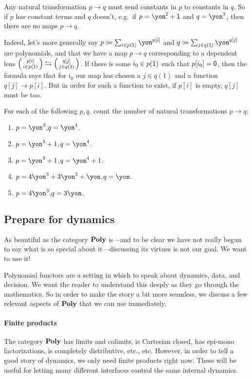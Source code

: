 \documentclass[DynamicalBook]{subfiles}
\begin{document}
\begin{example}\label{ex.const_to_const}
Any natural transformation $p\to q$ must send constants in $p$ to constants in $q$. So if $p$ has constant terms and $q$ doesn't, e.g.\ if $p=\yon^\2+\1$ and $q=\yon^3$, then there are no maps $p\to q$. 

Indeed, let's more generally say $p\coloneqq\sum_{i\in p(\1)}\yon^{p[i]}$ and
$q\coloneqq\sum_{j\in q(\1)}\yon^{q[j]}$ are polynomials, and that we have a map
$p\to q$ corresponding to a dependent lens $\lens{p[i]}{i \in p(\1)} \fromto
\lens{q[j]}{j \in q(\1)}$. If there is some $i_0\in p(\textsf{1})$ such that $p[i_0]=\textsf{0}$, then the formula says that for $i_0$ our map has chosen a $j\in q(1)$ and a function $q[j]\to p[i]$. But in order for such a function to exist, if $p[i]$ is empty, $q[j]$ must be too.
\end{example}

\begin{exercise}
For each of the following $p,q$, count the number of natural transformations $p\to q$:
\begin{enumerate}
	\item $p=\yon^3$,\quad $q=\yon^4$.
	\item $p=\yon^3+1$,\quad $q=\yon^4$.
	\item $p=\yon^3+1$,\quad $q=\yon^4+1$.
	\item $p=4\yon^3+3\yon^2+\yon$,\quad $q=\yon$.
	\item $p=4\yon^3$,\quad $q=3\yon$.
\qedhere
\end{enumerate}
\end{exercise}

\subsection{Prepare for dynamics}\label{subsec_prepare_dyn}

As beautiful as the category $\textbf{Poly}$ is---and to be clear we have not really begun to say what is so special about it---discussing its virtues is not our goal. We want to use it!

Polynomial functors are a setting in which to speak about dynamics, data, and decision. We want the reader to understand this deeply as they go through the mathematics. So in order to make the story a bit more seamless, we discuss a few relevant aspects of $\textbf{Poly}$ that we can use immediately.


\paragraph{Finite products}
The category $\textbf{Poly}$ has limits and colimits, is Cartesian closed, has epi-mono factorizations, is completely distributive, etc., etc. However, in order to tell a good story of dynamics, we only need finite products right now. These will be useful for letting many different interfaces control the same internal dynamics.
\end{document}
